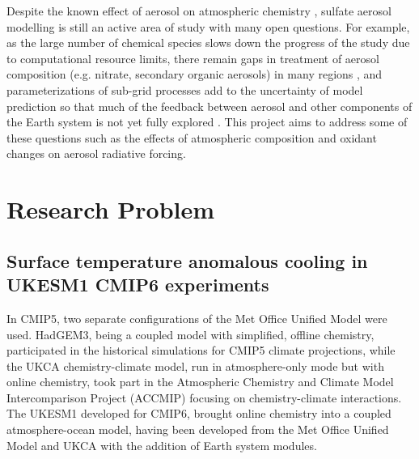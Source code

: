 Despite the known effect of aerosol on atmospheric chemistry \citep[e.g.][]{oconnorApportionmentPreIndustrial2022}, sulfate aerosol modelling is still an active area of study with many open questions. For example, as the large number of chemical species slows down the progress of the study due to computational resource limits, there remain gaps in treatment of aerosol composition (e.g. nitrate, secondary organic aerosols) in many regions \citep[e.g.][]{mulcahyDescriptionEvaluationAerosol2020}, and parameterizations of sub-grid processes add to the uncertainty of model prediction so that much of the feedback between aerosol and other components of the Earth system is not yet fully explored \citep{seikiImprovementGlobalCloudSystemResolving2015}. This project aims to address some of these questions such as the effects of atmospheric composition and oxidant changes on aerosol radiative forcing.

\section{Research Problem}

\subsection{Surface temperature anomalous cooling in UKESM1 CMIP6 experiments}


In CMIP5, two separate configurations of the Met Office Unified Model were used. HadGEM3, being a coupled model with simplified, offline chemistry, participated in the historical simulations for CMIP5 climate projections,  while the UKCA chemistry-climate model, run in atmosphere-only mode but with online chemistry, took part in the Atmospheric Chemistry and Climate Model Intercomparison Project (ACCMIP) focusing on chemistry-climate interactions. The UKESM1 developed for CMIP6, brought online chemistry into a coupled atmosphere-ocean model, having been developed from the Met Office Unified Model and UKCA with the addition of Earth system modules.

